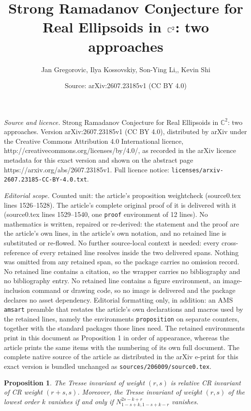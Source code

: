 \documentclass[10pt,a4paper]{amsart}
\title{Strong Ramadanov Conjecture for Real Ellipsoids in $\CC^2$: two approaches}
\author{Jan Gregorovic, Ilya Kossovskiy, Son-Ying Li,, Kevin Shi}
\date{Source: arXiv:2607.23185v1 (CC BY 4.0)}
\def\CC{\mathbb{C}}
\newtheorem{proposition}{Proposition}
\begin{document}
\maketitle

\noindent\emph{Source and licence.} Strong Ramadanov Conjecture for Real Ellipsoids in $\CC^2$: two approaches. Version arXiv:2607.23185v1 (CC BY 4.0), distributed by arXiv under the Creative Commons Attribution 4.0 International licence, http://creativecommons.org/licenses/by/4.0/, as recorded in the arXiv licence metadata for this exact version and shown on the abstract page https://arxiv.org/abs/2607.23185v1. Full licence notice: \texttt{licenses/arxiv-2607.23185-CC-BY-4.0.txt}.\par\smallskip

\noindent\textit{Editorial scope.} Counted unit: the article's proposition weightcheck (source0.tex lines 1526--1528). The article's complete original proof of it is delivered with it (source0.tex lines 1529--1540, one \texttt{proof} environment of 12 lines). No mathematics is written, repaired or re-derived: the statement and the proof are the article's own lines, in the article's own notation, and no retained line is substituted or re-flowed.  No further source-local context is needed: every cross-reference of every retained line resolves inside the two delivered spans.  Nothing was omitted from any retained span, so the package carries no omission record.  No retained line contains a citation, so the wrapper carries no bibliography and no bibliography entry.  No retained line contains a figure environment, an image-inclusion command or drawing code, so no image is delivered and the package declares no asset dependency.  Editorial formatting only, in addition: an AMS \texttt{amsart} preamble that restates the article's own declarations and macros used by the retained lines, namely the environments \texttt{proposition} on separate counters, together with the standard packages those lines need.  The retained environments print in this document as Proposition 1 in order of appearance, whereas the article prints the same items with the numbering of its own full document.  The complete native source of the article as distributed in the arXiv e-print for this exact version is bundled unchanged as \texttt{sources/206009/source0.tex}.
\begin{proposition}\label{weightcheck}
The Tresse invariant of weight $(r,s)$ is relative CR invariant of CR weight $(r+s,s)$. Moreover, the Tresse invariant of weight $(r,s)$ of the lowest order $k$ vanishes if and only if $N^{2s-k+r}_{1-s+k,1-s+k-r}$ vanishes.
\end{proposition}
\end{document}
